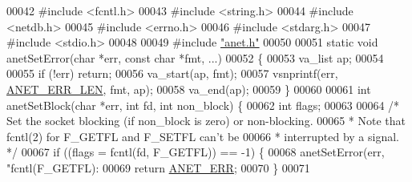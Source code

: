 \begin{DoxyCode}
00042 \textcolor{preprocessor}{#}\textcolor{preprocessor}{include} \textcolor{preprocessor}{<}\textcolor{preprocessor}{fcntl}\textcolor{preprocessor}{.}\textcolor{preprocessor}{h}\textcolor{preprocessor}{>}
00043 \textcolor{preprocessor}{#}\textcolor{preprocessor}{include} \textcolor{preprocessor}{<}\textcolor{preprocessor}{string}\textcolor{preprocessor}{.}\textcolor{preprocessor}{h}\textcolor{preprocessor}{>}
00044 \textcolor{preprocessor}{#}\textcolor{preprocessor}{include} \textcolor{preprocessor}{<}\textcolor{preprocessor}{netdb}\textcolor{preprocessor}{.}\textcolor{preprocessor}{h}\textcolor{preprocessor}{>}
00045 \textcolor{preprocessor}{#}\textcolor{preprocessor}{include} \textcolor{preprocessor}{<}\textcolor{preprocessor}{errno}\textcolor{preprocessor}{.}\textcolor{preprocessor}{h}\textcolor{preprocessor}{>}
00046 \textcolor{preprocessor}{#}\textcolor{preprocessor}{include} \textcolor{preprocessor}{<}\textcolor{preprocessor}{stdarg}\textcolor{preprocessor}{.}\textcolor{preprocessor}{h}\textcolor{preprocessor}{>}
00047 \textcolor{preprocessor}{#}\textcolor{preprocessor}{include} \textcolor{preprocessor}{<}\textcolor{preprocessor}{stdio}\textcolor{preprocessor}{.}\textcolor{preprocessor}{h}\textcolor{preprocessor}{>}
00048 
00049 \textcolor{preprocessor}{#}\textcolor{preprocessor}{include} \hyperlink{anet_8h}{"anet.h"}
00050 
00051 \textcolor{keyword}{static} \textcolor{keywordtype}{void} anetSetError(\textcolor{keywordtype}{char} *err, \textcolor{keyword}{const} \textcolor{keywordtype}{char} *fmt, ...)
00052 \{
00053     va\_list ap;
00054 
00055     \textcolor{keywordflow}{if} (!err) \textcolor{keywordflow}{return};
00056     va\_start(ap, fmt);
00057     vsnprintf(err, \hyperlink{anet_8h_a92d565f421c133e9fac9dbbe8c88922b}{ANET\_ERR\_LEN}, fmt, ap);
00058     va\_end(ap);
00059 \}
00060 
00061 \textcolor{keywordtype}{int} anetSetBlock(\textcolor{keywordtype}{char} *err, \textcolor{keywordtype}{int} fd, \textcolor{keywordtype}{int} non\_block) \{
00062     \textcolor{keywordtype}{int} flags;
00063 
00064     \textcolor{comment}{/* Set the socket blocking (if non\_block is zero) or non-blocking.}
00065 \textcolor{comment}{     * Note that fcntl(2) for F\_GETFL and F\_SETFL can't be}
00066 \textcolor{comment}{     * interrupted by a signal. */}
00067     \textcolor{keywordflow}{if} ((flags = fcntl(fd, F\_GETFL)) == -1) \{
00068         anetSetError(err, \textcolor{stringliteral}{"fcntl(F\_GETFL): %
00069         \textcolor{keywordflow}{return} \hyperlink{anet_8h_a0697b7774a7e0f4ef141839fe93536fe}{ANET\_ERR};
00070     \}
00071 
}
\end{DoxyCode}
